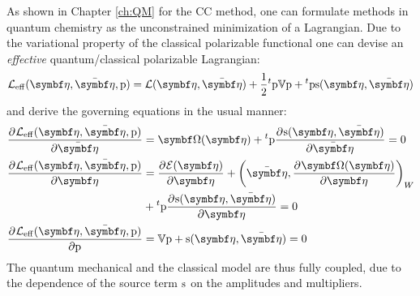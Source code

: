 As shown in Chapter \ref{ch:QM} for the \acrshort{CC} method, one can
formulate methods in quantum chemistry as the unconstrained minimization
of a Lagrangian.
Due to the  variational property of the classical polarizable functional
one can devise an \emph{effective} quantum/classical polarizable
Lagrangian:\autocite{Lipparini2016-mo}
\begin{equation}
  \mathcal{L}_\mathrm{eff}(\vect{\eta}, \bar{\vect{\eta}}, \p) =
  \mathcal{L}(\vect{\eta}, \bar{\vect{\eta}}) +
  \frac{1}{2}{}^t\p\V\p + {}^t\p\s(\vect{\eta}, \bar{\vect{\eta}})
\end{equation}
and derive the governing equations in the usual manner:
\begin{subequations}
  \begin{align}
    \pderiv{\mathcal{L}_\mathrm{eff}(\vect{\eta}, \bar{\vect{\eta}}, \p)}{\bar{\vect{\eta}}}
    &= \mat{\Omega}(\vect{\eta}) + {}^t\p\pderiv{\s(\vect{\eta}, \bar{\vect{\eta}})}{\bar{\vect{\eta}}} = 0 \\
    \pderiv{\mathcal{L}_\mathrm{eff}(\vect{\eta}, \bar{\vect{\eta}}, \p)}{\vect{\eta}}
    &= \pderiv{\mathcal{E}(\vect{\eta})}{\vect{\eta}} +
    \scalprod[W]{\bar{\vect{\eta}}}{\pderiv{\mat{\Omega(\vect{\eta})}}{\vect{\eta}}}
    \nonumber \\
    &+ {}^t\p\pderiv{\s(\vect{\eta}, \bar{\vect{\eta}})}{\vect{\eta}}
    = 0 \\
    \pderiv{\mathcal{L}_\mathrm{eff}(\vect{\eta}, \bar{\vect{\eta}}, \p)}{\p} &=
    \V\p + \s(\vect{\eta}, \bar{\vect{\eta}}) = 0
  \end{align}
\end{subequations}
The quantum mechanical and the classical model are thus fully coupled,
due to the dependence of the source term $\mathrm{s}$ on the amplitudes and
multipliers.

